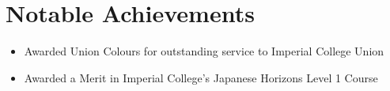 \documentclass[11pt,a4paper,sans]{moderncv}        %
\begin{document}
\section{Notable Achievements}

\begin{itemize}

\item Awarded Union Colours for outstanding service to Imperial College Union

\item Awarded a Merit in Imperial College's Japanese Horizons Level 1 Course

\end{itemize}

\nocite{*}



\end{document}
